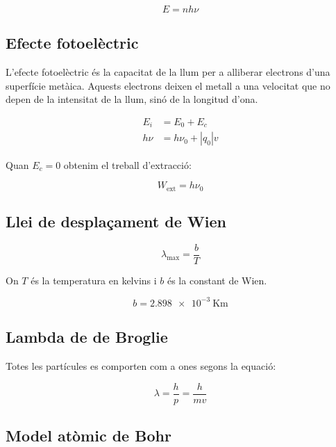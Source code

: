 \begin{equation}
    E = n h \nu
\end{equation}

\subsection{Efecte fotoelèctric}
\label{sub:efecte_fotoelectric}

L'efecte fotoelèctric és la capacitat de la llum per a alliberar electrons
d'una superfície metà\lgem ica. Aquests electrons deixen el metall a una
velocitat que no depen de la intensitat de la llum, sinó de la longitud d'ona.

\begin{align}
    E_i &= E_0 + E_c \\
    h\nu &= h\nu_0 + |q_0|v
\end{align}

Quan $E_c = 0$ obtenim el treball d'extracció:

\begin{equation}
    W_\text{ext} = h\nu_0
\end{equation}

\subsection{Llei de desplaçament de Wien}
\label{sub:llei_de_desplacament_de_wien}

\begin{equation}
    \lambda_\text{max} = \frac{b}{T}
\end{equation}

On $T$ és la temperatura en kelvins i $b$ és la constant de Wien.

\begin{equation}
    b = \SI{2.898e-3}{\kelvin\metre}
\end{equation}

\subsection{Lambda de de Broglie}
\label{sub:lambda_de_de_broglie}

Totes les partícules es comporten com a ones segons la equació:

\begin{equation}
    \lambda = \frac{h}{p} = \frac{h}{mv}
\end{equation}

\pagebreak

\subsection{Model atòmic de Bohr}
\label{sub:model_atomic_de_bohr}

